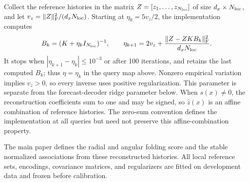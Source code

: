 Collect the reference histories in the matrix
$Z=[z_1,\ldots,z_{N_{\rm loc}}]$ of size $d_x\times N_{\rm loc}$,
and let $v_z=\|Z\|_{\rm F}^2/(d_xN_{\rm loc})$. Starting at
$\eta_0=5v_z/2$, the implementation computes
\[
 B_k=(K+\eta_k I_{N_{\rm loc}})^{-1},\qquad
 \eta_{k+1}=2v_z+
       \frac{\|Z-ZKB_k\|_{\rm F}^2}{d_xN_{\rm loc}}.
\]
It stops when $|\eta_{k+1}-\eta_k|\leq10^{-3}$ or after 100 iterations,
and retains the last computed $B_k$; thus $\eta=\eta_k$ in the query map
above. Nonzero empirical variation implies $v_z>0$, so every inverse uses
positive regularization. This parameter is separate from the
forecast-decoder ridge parameter below.
When $s(x)\ne0$, the reconstruction coefficients sum to one and may be signed,
so $\widehat z(x)$ is an affine combination of reference histories. The
zero-sum convention defines the implementation at all queries but need not
preserve this affine-combination property.


The main paper defines the radial and angular folding score and the stable
normalized associations from these reconstructed histories. All local reference
sets, encodings, covariance matrices, and regularizers are fitted on development
data and frozen before calibration.
